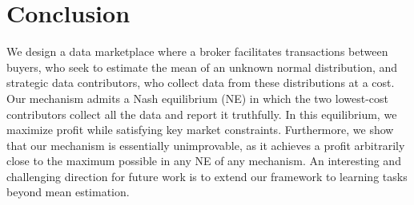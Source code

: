 
\section{Conclusion}
\label{sec:conclusion}

We design a data marketplace where a broker facilitates transactions between buyers, who seek to estimate the mean of an unknown normal distribution, and strategic data contributors, who collect data from these distributions at a cost. Our mechanism admits a Nash equilibrium (NE) in which the two lowest-cost contributors collect all the data and report it truthfully. In this equilibrium, we maximize profit while satisfying key market constraints.  
Furthermore, we show that our mechanism is essentially unimprovable, as it achieves a profit arbitrarily close to the maximum possible in any NE of any mechanism. An interesting and challenging direction for future work is to extend our framework to learning tasks beyond mean estimation.  

